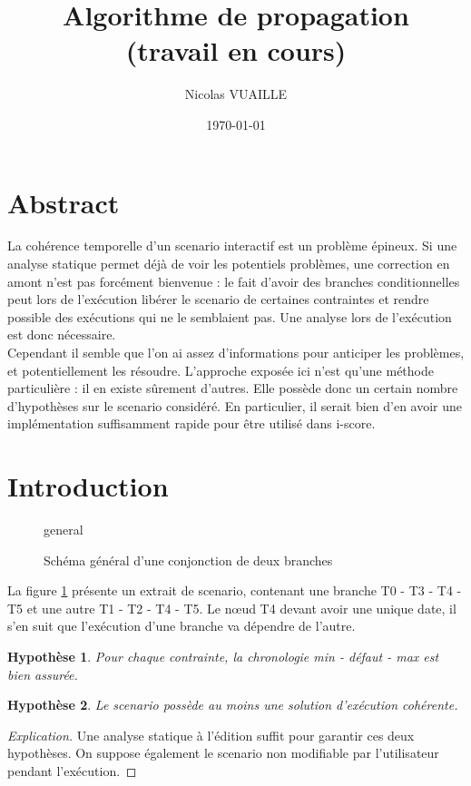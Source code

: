 \documentclass[10pt,a4paper]{article}
\author{Nicolas VUAILLE}
\title{Algorithme de propagation \\ (travail en cours)}
\date{\today}
\newtheorem{presup}{Hypothèse}
\newcommand*{\TikzPath}{../Algo/PropagationTIKZ}%
\begin{document}
\maketitle

\section*{Abstract}

La cohérence temporelle d'un scenario interactif est un problème épineux. Si une analyse statique permet déjà de voir les potentiels problèmes, une correction en amont n'est pas forcément bienvenue : le fait d'avoir des branches conditionnelles peut lors de l'exécution libérer le scenario de certaines contraintes et rendre possible des exécutions qui ne le semblaient pas. Une analyse lors de l'exécution est donc nécessaire. \\

Cependant il semble que l'on ai assez d'informations pour anticiper les problèmes, et potentiellement les résoudre. L'approche exposée ici n'est qu'une méthode particulière : il en existe sûrement d'autres. Elle possède donc un certain nombre d'hypothèses sur le scenario considéré. En particulier, il serait bien d'en avoir une implémentation suffisamment rapide pour être utilisé dans i-score. \\

\tableofcontents

\newpage
\section{Introduction}

	\begin{figure}[h]
		\centering
		
		\schemaScenario general
		\caption{Schéma général d'une conjonction de deux branches}
		\label{S:general}
	\end{figure}

La figure \ref{S:general} présente un extrait de scenario, contenant une branche T0 - T3 - T4 - T5 et une autre T1 - T2 - T4 - T5. Le nœud T4 devant avoir une unique date, il s'en suit que l'exécution d'une branche va dépendre de l'autre.

	\begin{presup}
		Pour chaque contrainte, la chronologie min - défaut - max est bien assurée.
		\label{P:Chronologie}
	\end{presup}
	\begin{presup}
		Le scenario possède au moins une solution d'exécution cohérente.
		\label{P:Executabilite}
	\end{presup}
	\begin{proof}[Explication]
		Une analyse statique à l'édition suffit pour garantir ces deux hypothèses. On suppose également le scenario non modifiable par l'utilisateur pendant l'exécution.
	\end{proof}
\end{document}
